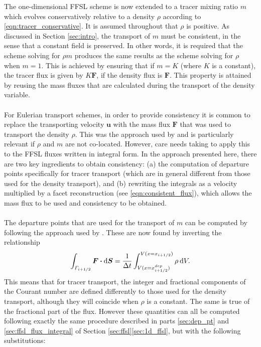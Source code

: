 \documentclass{ametsocV6.1}
\newcommand{\dx}[1]{\hspace{0.75mm}\mathrm{d}{#1}}
\begin{document}
The one-dimensional FFSL scheme is now extended to a tracer mixing ratio $m$ which evolves conservatively relative to a density $\rho$ according to \eqref{eqn:tracer_conservative}.
It is assumed throughout that $\rho$ is positive.
As discussed in Section \ref{sec:intro}, the transport of $m$ must be consistent, in the sense that a constant field is preserved.
In other words, it is required that the scheme solving for $\rho m$ produces the same results as the scheme solving for $\rho$ when $m=1$.
This is achieved by ensuring that if $m=K$ (where $K$ is a constant), the tracer flux is given by $K\bm{F}$, if the density flux is $\bm{F}$.
This property is attained by reusing the mass fluxes that are calculated during the transport of the density variable.
\\
\\
For Eulerian transport schemes, in order to provide consistency it is common to replace the transporting velocity $\bm{u}$ with the mass flux $\bm{F}$ that was used to transport the density $\rho$. This was the approach used by \citet{bendall2023solution} and is particularly relevant if $\rho$ and $m$ are not co-located.
However, care needs taking to apply this to the FFSL fluxes written in integral form.
In the approach presented here, there are two key ingredients to obtain consistency:
(a) the computation of departure points specifically for tracer transport (which are in general different from those used for the density transport), and (b) rewriting the integrals as a velocity multiplied by a facet reconstruction (see \eqref{eqn:consistent_flux}), which allows the mass flux to be used and consistency to be obtained. \\
\\
The departure points that are used for the transport of $m$ can be computed by following the approach used by \cite{skamarock2006limiters}.
These are now found by inverting the relationship
\begin{equation}
\int_{\varGamma_{i+1/2}} \bm{F} \bm{\cdot} \mathrm{d}\bm{S} = \frac{1}{\Delta t} \int_{V(x=x^{dep}_{i+1/2})}^{V(x=x_{i+1/2})} \rho \dx{V}.
\end{equation}
This means that for tracer transport, the integer and fractional components of the Courant number are defined differently to those used for the density transport, although they will coincide when $\rho$ is a constant.
The same is true of the fractional part of the flux.
However these quantities can all be computed following exactly the same procedure described in parts \ref{sec:dep_pt} and \ref{sec:ffsl_flux_integral} of Section \ref{sec:ffsl}\ref{sec:1d_ffsl}, but with the following substitutions:
\end{document}
